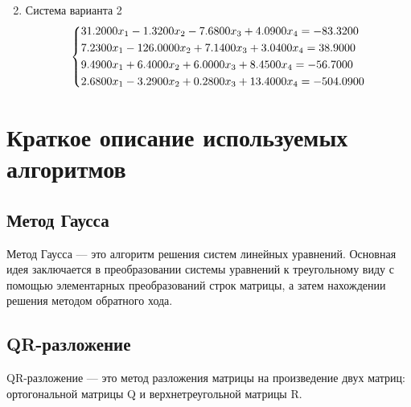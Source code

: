 \documentclass{article}
\begin{document}
\begin{enumerate}
\begin{equation}
        \end{equation}
        \item Система варианта 2
        \begin{equation}
            \begin{dcases}
                31.2000x_1 -1.3200x_2 -7.6800 x_3 + 4.0900 x_4 = -83.3200 \\
                7.2300 x_1 -126.0000 x_2 + 7.1400 x_3 + 3.0400 x_4 = 38.9000 \\ 
                9.4900 x_1 + 6.4000 x_2 + 6.0000 x_3 + 8.4500 x_4 = -56.7000 \\ 
                2.6800 x_1 -3.2900 x_2 + 0.2800 x_3 + 13.4000 x_4 = -504.0900
            \end{dcases}
        \end{equation}  
    \end{enumerate}

\section{Краткое описание используемых алгоритмов}
\subsection{Метод Гаусса}
Метод Гаусса --- это алгоритм решения систем линейных уравнений. 
Основная идея заключается в преобразовании системы уравнений к треугольному виду с 
помощью элементарных преобразований строк матрицы, а затем нахождении решения методом обратного 
хода.
\subsection{QR-разложение}
QR-разложение --- это метод разложения матрицы на произведение двух матриц: ортогональной матрицы 
Q и верхнетреугольной матрицы R.
\end{document}
